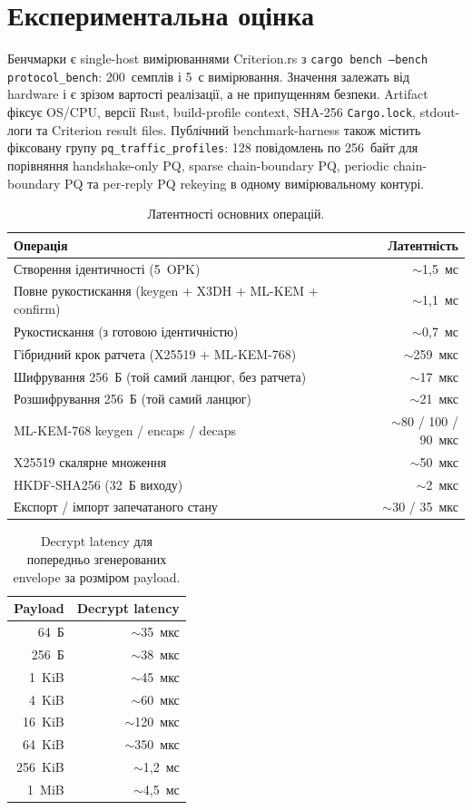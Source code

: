 \documentclass[11pt,a4paper]{article}
\theoremstyle{definition}
\begin{document}
\section{Експериментальна оцінка}\label{sec:evaluation}

Бенчмарки є single-host вимірюваннями Criterion.rs з
\texttt{cargo bench --bench protocol\_bench}: 200~семплів і 5~с
вимірювання. Значення залежать від hardware і є зрізом вартості
реалізації, а не припущенням безпеки. Artifact фіксує OS/CPU, версії
Rust, build-profile context, SHA-256 \texttt{Cargo.lock}, stdout-логи та
Criterion result files.
Публічний benchmark-harness також містить фіксовану групу
\texttt{pq\_traffic\_profiles}: 128 повідомлень по
256~байт для порівняння handshake-only PQ, sparse chain-boundary PQ, periodic
chain-boundary PQ та per-reply PQ rekeying в одному вимірювальному контурі.

\begin{table}[H]
\centering
\caption{Латентності основних операцій.}\label{tab:bench-core}
\small
\begin{tabular}{@{}lr@{}}
\toprule
Операція & Латентність \\
\midrule
Створення ідентичності (5~OPK) & $\sim$1{,}5~мс \\
Повне рукостискання (keygen $+$ X3DH $+$ ML-KEM $+$ confirm) & $\sim$1{,}1~мс \\
Рукостискання (з готовою ідентичністю) & $\sim$0{,}7~мс \\
Гібридний крок ратчета (X25519 $+$ ML-KEM-768) & $\sim$259~мкс \\
Шифрування 256~Б (той самий ланцюг, без ратчета) & $\sim$17~мкс \\
Розшифрування 256~Б (той самий ланцюг) & $\sim$21~мкс \\
\midrule
ML-KEM-768 keygen / encaps / decaps & $\sim$80 / 100 / 90~мкс \\
X25519 скалярне множення & $\sim$50~мкс \\
HKDF-SHA256 (32~Б виходу) & $\sim$2~мкс \\
Експорт / імпорт запечатаного стану & $\sim$30 / 35~мкс \\
\bottomrule
\end{tabular}
\end{table}

\begin{table}[H]
\centering
\caption{Decrypt latency для попередньо згенерованих envelope за розміром payload.}\label{tab:bench-payload}
\small
\begin{tabular}{@{}rr@{}}
\toprule
Payload & Decrypt latency \\
\midrule
64~Б & $\sim$35~мкс \\
256~Б & $\sim$38~мкс \\
1~KiB & $\sim$45~мкс \\
4~KiB & $\sim$60~мкс \\
16~KiB & $\sim$120~мкс \\
64~KiB & $\sim$350~мкс \\
256~KiB & $\sim$1{,}2~мс \\
1~MiB & $\sim$4{,}5~мс \\
\bottomrule
\end{tabular}
\end{table}
\end{document}
